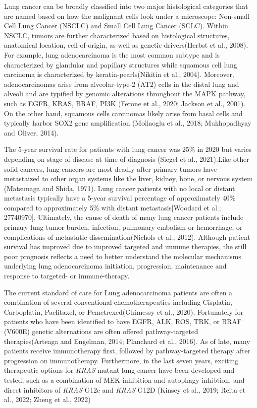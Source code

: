 Lung cancer can be broadly classified into two major histological categories that are named based on how the malignant cells look under a microscope: Non-small Cell Lung Cancer (NSCLC) and Small Cell Lung Cancer (SCLC). Within NSCLC, tumors are further characterized based on histological structures, anatomical location, cell-of-origin, as well as genetic drivers(Herbst et al., 2008). For example, lung adenocarcinoma is the most common subtype and is characterized by glandular and papillary structures while squamous cell lung carcinoma is characterized by keratin-pearls(Nikitin et al., 2004). Moreover, adenocarcinomas arise from alveolar-type-2 (AT2) cells in the distal lung and alveoli and are typified by genomic alterations throughout the MAPK pathway, such as EGFR, KRAS, BRAF, PI3K (Ferone et al., 2020; Jackson et al., 2001). On the other hand, squamous cells carcinomas likely arise from basal cells and typically harbor SOX2 gene amplification (Mollaoglu et al., 2018; Mukhopadhyay and Oliver, 2014).

The 5-year survival rate for patients with lung cancer was 25\% in 2020 but varies depending on stage of disease at time of diagnosis (Siegel et al., 2021).Like other solid cancers, lung cancers are most deadly after primary tumors have metastaized to other organ systems like the liver, kidney, bone, or nervous system (Matsunaga and Shida, 1971). Lung cancer patients with no local or distant metastasis typically have a 5-year survival percentage of approximately 40\% compared to approximately 5\% with distant metastasis{[}Woodard et al.; 27740970{]}. Ultimately, the cause of death of many lung cancer patients include primary lung tumor burden, infection, pulmonary embolism or hemorrhage, or complications of metastatic dissemination(Nichols et al., 2012). Although patient survival has improved due to improved targeted and immune therapies, the still poor prognosis reflects a need to better understand the molecular mechanisms underlying lung adenocarcinoma initiation, progression, maintenance and response to targeted- or immune-therapy.

The current standard of care for Lung adenocarcinoma patients are often a combination of several conventional chemotherapeutics including Cisplatin, Carboplatin, Paclitaxel, or Pemetrexed(Ghimessy et al., 2020). Fortunately for patients who have been identified to have EGFR, ALK, ROS, TRK, or BRAF (V600E) genetic alternations are often offered pathway-targeted therapies(Arteaga and Engelman, 2014; Planchard et al., 2016). As of late, many patients receive immunotherapy first, followed by pathway-targeted therapy after progression on immunotherapy. Furthermore, in the last seven years, exciting therapeutic options for \emph{KRAS} mutant lung cancer have been developed and tested, such as a combination of MEK-inhibition and autophagy-inhibtion, and direct inhibitors of \emph{KRAS} G12c and \emph{KRAS} G12D (Kinsey et al., 2019; Reita et al., 2022; Zheng et al., 2022)

